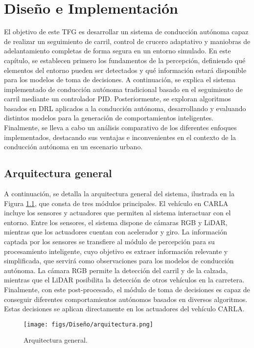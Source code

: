 \chapter{Diseño e Implementación}
\label{cap:capitulo4}

El objetivo de este \ac{TFG} es desarrollar un sistema de conducción autónoma capaz de realizar un seguimiento de carril, control de crucero adaptativo y maniobras de adelantamiento completas de forma segura en un entorno simulado. En este capítulo, se establecen primero los fundamentos de la percepción, definiendo qué elementos del entorno pueden ser detectados y qué información estará disponible para los modelos de toma de decisiones. A continuación, se explica el sistema implementado de conducción autónoma tradicional basado en el seguimiento de carril mediante un controlador \ac{PID}. Posteriormente, se exploran algoritmos basados en \ac{DRL} aplicados a la conducción autónoma, desarrollando y evaluando distintos modelos para la generación de comportamientos inteligentes. Finalmente, se lleva a cabo un análisis comparativo de los diferentes enfoques implementados, destacando sus ventajas e inconvenientes en el contexto de la conducción autónoma en un escenario urbano.

\section{Arquitectura general}

A continuación, se detalla la arquitectura general del sistema, ilustrada en la Figura \ref{fig:arch}, que consta de tres módulos principales. El vehículo en CARLA incluye los sensores y actuadores que permiten al sistema interactuar con el entorno. Entre los sensores, el sistema dispone de cámaras RGB y \ac{LiDAR}, mientras que los actuadores cuentan con acelerador y giro. La información captada por los sensores se transfiere al módulo de percepción para su procesamiento inteligente, cuyo objetivo es extraer información relevante y simplificada, que servirá como observaciones para los modelos de conducción autónoma. La cámara RGB permite la detección del carril y de la calzada, mientras que el \ac{LiDAR} posibilita la detección de otros vehículos en la carretera. Finalmente, con este post-procesado, el módulo de toma de decisiones es capaz de conseguir diferentes comportamientos autónomos basados en diversos algoritmos. Estas decisiones se aplican directamente en los actuadores del vehículo CARLA.

\begin{figure}[ht]
  \centering
  \texttt{[image: figs/Diseño/arquitectura.png]}
  \caption{Arquitectura general.}
  \label{fig:arch}
\end{figure}

